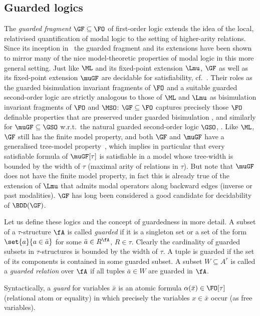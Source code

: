 \documentclass{LMCS}
\begin{document}
\subsection{Guarded logics}
\label{subsec:guarded}

The \emph{guarded fragment} $\GF \subseteq \FO$ of
first-order logic extends the idea of
the local, relativised quantification of modal logic to the setting
of higher-arity relations. Since its inception in~\cite{ABN} the guarded
fragment and its extensions have been shown to mirror many of the nice
model-theoretic properties of modal logic in this more general setting.
Just like $\ML$ and its fixed-point extension $\Lmu$,
$\GF$ as well as its fixed-point extension $\muGF$
are decidable for satisfiability, cf.\ \cite{ABN,Graedel99,GW}.
Their roles as the guarded bisimulation invariant fragments of $\FO$
and a suitable guarded second-order logic are strictly analogous to those
of $\ML$ and $\Lmu$ as
bisimulation invariant fragments of $\FO$ and $\MSO$\?:
$\GF \subseteq \FO$ captures precisely those
$\FO$ definable properties that are preserved under guarded bisimulation
\cite{ABN}, and similarly for $\muGF \subseteq \GSO$ w.r.t.\
the natural guarded second-order logic $\GSO$, \cite{GHO}.
Like $\ML$, $\GF$ still has the finite model property, and
both $\GF$ and $\muGF$ have a generalised tree-model
property~\cite{Graedel99,GW}, which implies
in particular that every satisfiable formula of
$\muGF[\tau]$ is satisfiable in a model whose tree-width
is bounded by the width of $\tau$ (maximal arity of relations in
$\tau$). But note that $\muGF$ does not have the finite model
property, in fact this is already true of the extension of $\Lmu$
that admits modal operators along backward edges (inverse or past
modalities).
$\GF$ has long been considered a good candidate for decidability of
$\BDD(\GF)$.

\smallskip
Let us define these logics and the concept of guardedness in more detail.
A subset of a $\tau$-structure $\fA$ is called \emph{guarded}
if it is a singleton set or a set of the form
$\set{ a }{ a \in \bar{a} }$ for some $\bar{a} \in R^\fA$,
$R \in \tau$. Clearly the cardinality of guarded subsets in
$\tau$-structures is bounded by the width of $\tau$.
A tuple is guarded if the set of its components is contained
in some guarded subset.
A subset $W \subseteq A^r$ is called a \emph{guarded relation} over $\fA$
if all tuples $\bar{a} \in W$ are guarded in $\fA$.

Syntactically, a \emph{guard} for variables $\bar{x}$ is an atomic
formula $\alpha(\bar{x}) \in \FO[\tau]$ (relational atom or equality)
in which precisely the variables $x \in \bar{x}$ occur (as free variables).
\end{document}

